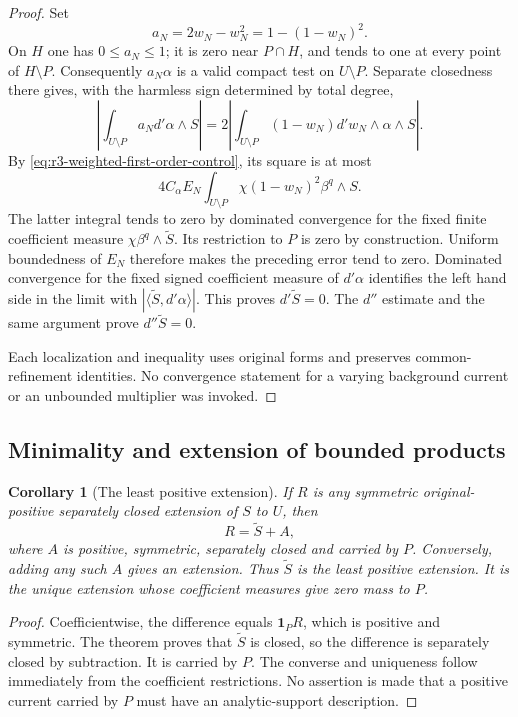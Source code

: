 \documentclass[11pt,a4paper]{article}
\numberwithin{equation}{section}
\newtheorem{corollary}[theorem]{Corollary}
\theoremstyle{definition}
\theoremstyle{remark}
\begin{document}
\begin{proof}
Set
\[
 a_N=2w_N-w_N^2=1-(1-w_N)^2.
\]
On $H$ one has $0\leq a_N\leq1$; it is zero near
$P\cap H$, and tends to one at every point of
$H\setminus P$. Consequently $a_N\alpha$ is a
valid compact test on $U\setminus P$. Separate
closedness there gives, with the harmless sign
determined by total degree,
\[
 \left|\int_{U\setminus P}a_Nd'\alpha\wedge S\right|
 =2\left|\int_{U\setminus P}
              (1-w_N)d'w_N\wedge\alpha\wedge S\right|.
\]
By \eqref{eq:r3-weighted-first-order-control}, its
square is at most
\[
 4C_\alpha E_N
       \int_{U\setminus P}\chi(1-w_N)^2\beta^q\wedge S .
\]
The latter integral tends to zero by dominated
convergence for the fixed finite coefficient measure
$\chi\beta^q\wedge\widetilde S$. Its restriction to
$P$ is zero by construction. Uniform boundedness of
$E_N$ therefore makes the preceding error tend to zero.
Dominated convergence for the fixed signed coefficient
measure of $d'\alpha$ identifies the left hand side
in the limit with $|\langle\widetilde S,d'\alpha\rangle|$.
This proves $d'\widetilde S=0$. The $d''$ estimate and
the same argument prove $d''\widetilde S=0$.

Each localization and inequality uses original
forms and preserves common-refinement identities.
No convergence statement for a varying background
current or an unbounded multiplier was invoked.
\end{proof}

\subsection{Minimality and extension of bounded products}

\begin{corollary}[The least positive extension]
\label{cor:r3-minimal-zero-extension}
If $R$ is any symmetric original-positive separately closed
extension of $S$ to $U$, then
\[
 R=\widetilde S+A,
\]
where $A$ is positive, symmetric, separately closed and
carried by $P$. Conversely, adding any such $A$ gives
an extension. Thus $\widetilde S$ is the least positive
extension. It is the unique extension whose coefficient
measures give zero mass to $P$.
\end{corollary}

\begin{proof}
Coefficientwise, the difference equals $\mathbf1_PR$,
which is positive and symmetric. The theorem proves
that $\widetilde S$ is closed, so the difference is
separately closed by subtraction. It is carried by
$P$. The converse and uniqueness follow immediately
from the coefficient restrictions. No assertion is
made that a positive current carried by $P$ must
have an analytic-support description.
\end{proof}
\end{document}
